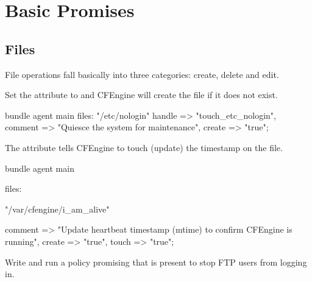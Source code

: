 



\chapter{Basic Promises}





\section{Files}

File operations fall basically into three categories: create, delete and edit.

Set the  attribute to  and CFEngine will create the file if it does not exist.

\begin{codelisting}
\begin{code}
bundle agent main
{
  files:
      "/etc/nologin"
        handle => "touch_etc_nologin",
        comment => "Quiesce the system for maintenance",
        create  => "true";
}
\end{code}
\end{codelisting}





The  attribute tells CFEngine to touch (update) the timestamp on the file.

\begin{codelisting}
\begin{code}
bundle agent main
{
  files:

      "/var/cfengine/i_am_alive"

        comment => "Update heartbeat timestamp (mtime)
                          to confirm CFEngine is running",
        create  => "true",
        touch   => "true";
}
\end{code}
\end{codelisting}





\begin{aside}
\label{aside:exercise_9}

Write and run a policy promising that  is present to
stop FTP users from logging in.

\end{aside}





